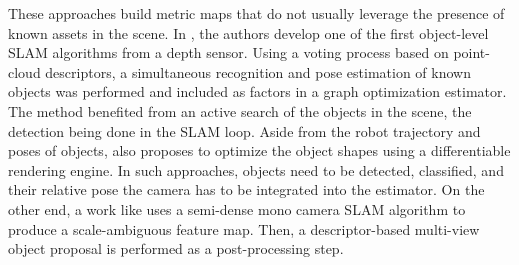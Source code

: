 These approaches build metric maps that do not usually leverage the presence of known assets in the scene. In \cite{SalasMoreno2013SLAMSL}, 
the authors develop one of the first object-level SLAM algorithms from a depth sensor. Using a voting process based on point-cloud descriptors, 
a simultaneous recognition and pose estimation of known objects was performed and included as factors in a graph optimization estimator. 
The method benefited from an active search of the objects in the scene, the detection being done in the SLAM loop.
Aside from the robot trajectory and poses of objects, \cite{sucar2020nodeslam} also proposes to optimize the object shapes using a differentiable 
rendering engine. In such approaches, objects need to be detected, classified, and their relative pose \wrt the camera has to be integrated into the estimator. 
On the other end, a work like \cite{pillai2015monocular} uses a semi-dense mono camera SLAM algorithm to produce a scale-ambiguous feature map. 
Then, a descriptor-based multi-view object proposal is performed as a post-processing step. 




